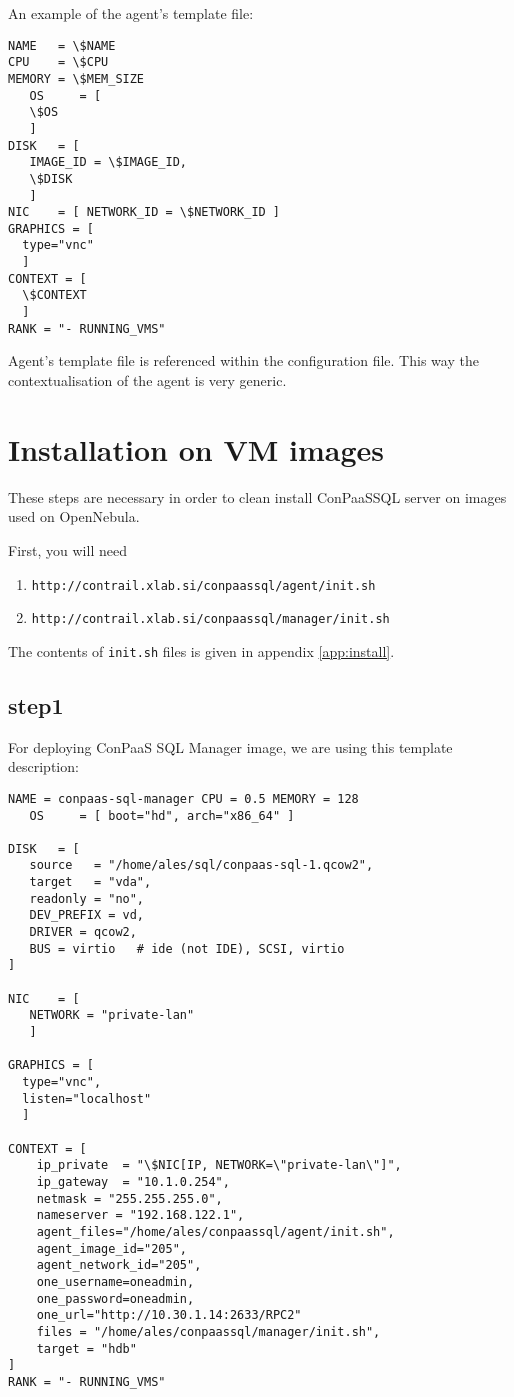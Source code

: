 \documentclass[a4paper,10pt]{article}
\begin{document}
An example of the agent's template file:

\begin{Verbatim}[frame=single]
NAME   = \$NAME
CPU    = \$CPU
MEMORY = \$MEM_SIZE
   OS     = [
   \$OS 
   ]
DISK   = [
   IMAGE_ID = \$IMAGE_ID,
   \$DISK 
   ]
NIC    = [ NETWORK_ID = \$NETWORK_ID ]
GRAPHICS = [
  type="vnc"
  ]
CONTEXT = [
  \$CONTEXT   
  ]
RANK = "- RUNNING_VMS"
\end{Verbatim}

Agent's template file is referenced within the configuration file. This way the contextualisation of the agent is very generic. 

\section{Installation on VM images}
\label{sec:install}

These steps are necessary in order to clean install ConPaaSSQL server on images used on OpenNebula.

First, you will need
\begin{enumerate}
\item {\tt http://contrail.xlab.si/conpaassql/agent/init.sh}
\item {\tt http://contrail.xlab.si/conpaassql/manager/init.sh}
\end{enumerate}

The contents of {\tt init.sh} files is given in appendix \ref{app:install}.

\subsection*{step1}

For deploying ConPaaS SQL Manager image, we are using this template description:

\begin{Verbatim}[frame=single]
NAME = conpaas-sql-manager CPU = 0.5 MEMORY = 128
   OS     = [ boot="hd", arch="x86_64" ]

DISK   = [
   source   = "/home/ales/sql/conpaas-sql-1.qcow2",
   target   = "vda",
   readonly = "no",
   DEV_PREFIX = vd,
   DRIVER = qcow2,
   BUS = virtio   # ide (not IDE), SCSI, virtio
]

NIC    = [ 
   NETWORK = "private-lan"
   ]

GRAPHICS = [
  type="vnc", 
  listen="localhost"
  ]

CONTEXT = [
	ip_private  = "\$NIC[IP, NETWORK=\"private-lan\"]",
    ip_gateway  = "10.1.0.254",
    netmask = "255.255.255.0",
    nameserver = "192.168.122.1",
    agent_files="/home/ales/conpaassql/agent/init.sh",
    agent_image_id="205",
    agent_network_id="205",
    one_username=oneadmin,
    one_password=oneadmin,
    one_url="http://10.30.1.14:2633/RPC2"
  	files = "/home/ales/conpaassql/manager/init.sh",
  	target = "hdb"
]
RANK = "- RUNNING_VMS"
\end{Verbatim}
\end{document}

